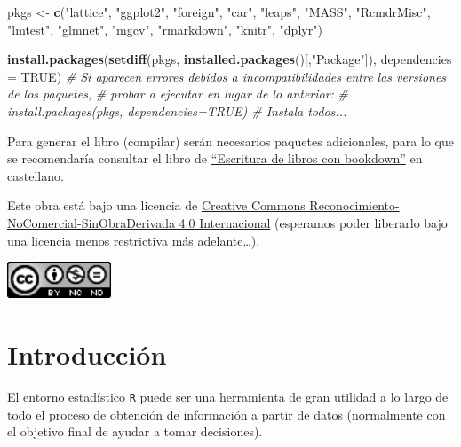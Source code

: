 \documentclass[]{book}
\newenvironment{Shaded}{\begin{snugshade}}{\end{snugshade}}
\newcommand{\KeywordTok}[1]{\textcolor[rgb]{0.13,0.29,0.53}{\textbf{#1}}}
\newcommand{\DataTypeTok}[1]{\textcolor[rgb]{0.13,0.29,0.53}{#1}}
\newcommand{\StringTok}[1]{\textcolor[rgb]{0.31,0.60,0.02}{#1}}
\newcommand{\CommentTok}[1]{\textcolor[rgb]{0.56,0.35,0.01}{\textit{#1}}}
\newcommand{\OtherTok}[1]{\textcolor[rgb]{0.56,0.35,0.01}{#1}}
\newcommand{\NormalTok}[1]{#1}
\begin{document}
\begin{Shaded}
\begin{Highlighting}[]
\NormalTok{pkgs <-}\StringTok{ }\KeywordTok{c}\NormalTok{(}\StringTok{"lattice"}\NormalTok{, }\StringTok{"ggplot2"}\NormalTok{, }\StringTok{"foreign"}\NormalTok{, }\StringTok{"car"}\NormalTok{, }\StringTok{"leaps"}\NormalTok{, }\StringTok{"MASS"}\NormalTok{, }\StringTok{"RcmdrMisc"}\NormalTok{, }
          \StringTok{"lmtest"}\NormalTok{, }\StringTok{"glmnet"}\NormalTok{, }\StringTok{"mgcv"}\NormalTok{, }\StringTok{"rmarkdown"}\NormalTok{, }\StringTok{"knitr"}\NormalTok{, }\StringTok{"dplyr"}\NormalTok{)}

\KeywordTok{install.packages}\NormalTok{(}\KeywordTok{setdiff}\NormalTok{(pkgs, }\KeywordTok{installed.packages}\NormalTok{()[,}\StringTok{"Package"}\NormalTok{]), }\DataTypeTok{dependencies =} \OtherTok{TRUE}\NormalTok{)}
\CommentTok{# Si aparecen errores debidos a incompatibilidades entre las versiones de los paquetes, }
\CommentTok{# probar a ejecutar en lugar de lo anterior:}
\CommentTok{# install.packages(pkgs, dependencies=TRUE) # Instala todos...}
\end{Highlighting}
\end{Shaded}

Para generar el libro (compilar) serán necesarios paquetes adicionales,
para lo que se recomendaría consultar el libro de
\href{https://rubenfcasal.github.io/bookdown_intro}{``Escritura de
libros con bookdown''} en castellano.

Este obra está bajo una licencia de
\href{https://creativecommons.org/licenses/by-nc-nd/4.0/deed.es_ES}{Creative
Commons Reconocimiento-NoComercial-SinObraDerivada 4.0 Internacional}
(esperamos poder liberarlo bajo una licencia menos restrictiva más
adelante\ldots{}).

\includegraphics[width=1.22in]{by-nc-nd-88x31}

\chapter{Introducción}\label{introduccion}

El entorno estadístico \texttt{R} puede ser una herramienta de gran
utilidad a lo largo de todo el proceso de obtención de información a
partir de datos (normalmente con el objetivo final de ayudar a tomar
decisiones).
\end{document}
